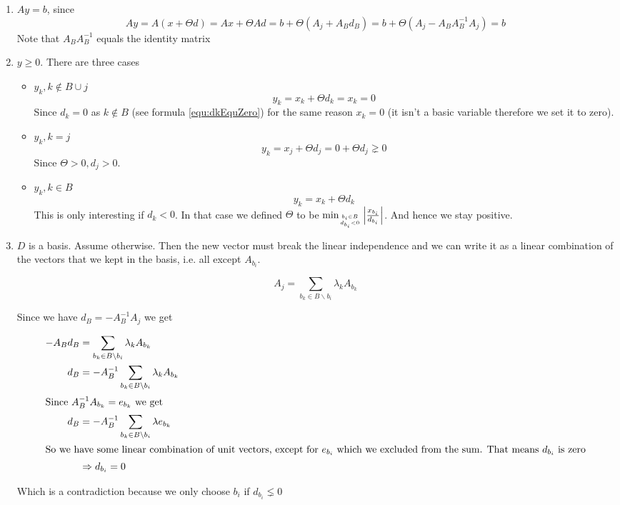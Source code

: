 \begin{enumerate}
\item $Ay=b$, since 
\[Ay=A(x+\Theta d) = Ax + \Theta Ad = b+\Theta(A_j+A_Bd_B) = b+\Theta(A_j - A_BA_B^{-1}A_j) = b\]
Note that $A_BA_B^{-1}$ equals the identity matrix
\item $y\geq 0$. There are three cases

\begin{itemize}

\item $y_k, k\not \in B\cup j$
\[y_k=x_k+\Theta d_k = x_k = 0\]
Since $d_k=0$ as $k \not \in B$ (see formula \ref{equ:dkEquZero}) for the same reason $x_k=0$ (it isn't a basic variable therefore we set it to zero). 

\item $y_k, k=j$
\[ y_k = x_j + \Theta d_j = 0 + \Theta d_j\gneq 0\]
Since $\Theta>0, d_j>0$. 

\item $y_k,k\in B$
\[y_k=x_k+\Theta d_k\]
This is only interesting if $d_k<0$. In that case we defined $\Theta$ to be $\min_{{b_i\in B}\atop {d_{b_i} <0}} \left| \frac{x_{b_i}}{d_{b_i}}\right |$. And hence we stay positive.

\end{itemize}

\item $D$ is a basis. Assume otherwise. Then the new vector must break the linear independence and we can write it as a linear combination of the vectors that we kept in the basis, i.e. all except $A_{b_i}$.

\[A_j= \sum_{b_k\in B\backslash b_i} \lambda_k A_{b_k}\]

Since we have $d_B=-A_B^{-1}A_j$ we get

\begin{align*}
-A_Bd_B &= \sum_{b_k\in B\backslash b_i} \lambda_k A_{b_k}\\
 d_B&=-A_B^{-1}\sum_{b_k\in B\backslash b_i} \lambda_k A_{b_k}\\
\intertext{Since $A_B^{-1}A_{b_k}=e_{b_k}$ we get}
 d_B&=-A_B^{-1}\sum_{b_k\in B\backslash b_i} \lambda e_{b_k}\\
\intertext{So we have some linear combination of unit vectors, except for $e_{b_i}$ which we excluded from the sum. That means $d_{b_i}$ is zero}
 & \Rightarrow d_{b_i} = 0
\end{align*}

Which is a contradiction because we only choose $b_i$ if $d_{b_i}\lneq 0$
\end{enumerate}

